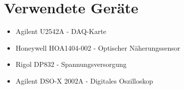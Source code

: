 \documentclass[a4paper,12pt]{article}
\begin{document}
	\section{Verwendete Geräte}
	\begin{itemize}
		\item Agilent U2542A - DAQ-Karte
		\item Honeywell HOA1404-002 - Optischer Näherungssensor
		\item Rigol DP832 - Spannungsversorgung
		\item Agilent DSO-X 2002A - Digitales Oszilloskop
	\end{itemize}
	\newpage
	\listoffigures
	\newpage
	\newpage
	\listoftables
	\newpage
\end{document}
